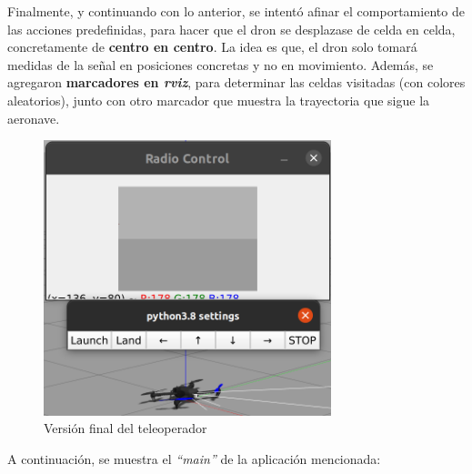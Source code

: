 Finalmente, y continuando con lo anterior, se intentó afinar el comportamiento de las acciones predefinidas, para hacer que el dron se desplazase de celda en celda, concretamente de \textbf{centro en centro}. La idea es que, el dron solo tomará medidas de la señal en posiciones concretas y no en movimiento. Además, se agregaron \textbf{marcadores en \emph{rviz}}, para determinar las celdas visitadas (con colores aleatorios), junto con otro marcador que muestra la trayectoria que sigue la aeronave.\\

\begin{figure} [H]
	\begin{center}
	\includegraphics[height=8cm]{imagenes/cap4/3_c2c_gui.png}
	\end{center}
	\caption[Versión final del teleoperador]{Versión final del teleoperador}
	\label{fig:teleoperador_end}
\end{figure}

\newpage
A continuación, se muestra el \emph{``main''} de la aplicación mencionada:\\

